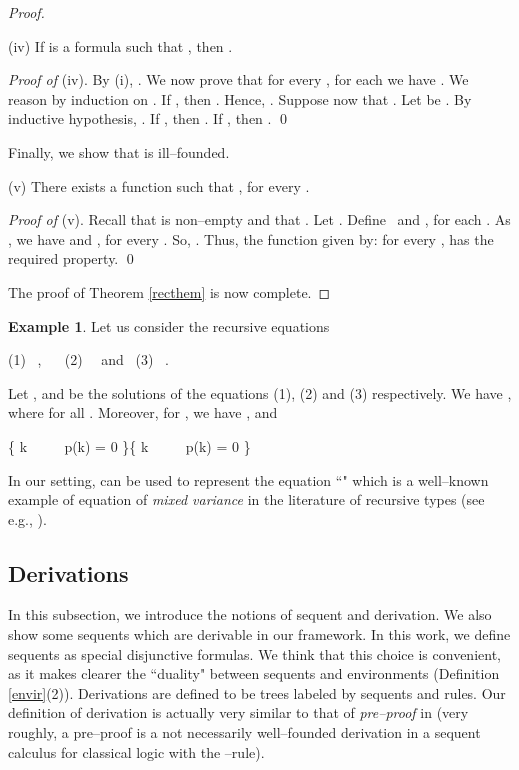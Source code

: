 \documentclass[copyright,creativecommons]{eptcs}
\def\eg{e.g., }
\newcommand{\st}{ \ \ \big{|} \ \ }
\theoremstyle{definition}
\newtheorem{Example}[theorem]{Example}
\newcommand{\squishlist}{
 \begin{list}{}
  { \setlength{\itemsep}{0pt}
     \setlength{\parsep}{3pt}
     \setlength{\topsep}{3pt}
     \setlength{\partopsep}{0pt}
     \setlength{\leftmargin}{1em}
     \setlength{\labelwidth}{1.5em}
     \setlength{\labelsep}{0.5em} } }
\newcommand{\squishend}{
  \end{list}  }
\begin{document}
\begin{proof}
\squishlist
\item[ (iv)] If   is a formula such that , then .
 \squishend
 \noindent\emph{Proof of} (iv).
By (i), .  We now prove that for every , for each  we have
 .
We reason by induction on .
If , then . Hence,
.
Suppose now that .
Let   be . By inductive hypothesis,  .
  If  , then .
 If  , then .
 \qed

Finally, we show that  is ill--founded.



\squishlist
\item[ (v)] There exists a function  such that
, for every .
 \squishend



 \noindent\emph{Proof of} (v).
Recall that   is non--empty and that . Let .
Define
\   and , for each .
As ,  we have  
and , for every .
So, .
Thus, the function  given by:  for every ,
has the required property. \qed



The proof of Theorem \ref{recthem} is now complete.
\end{proof}

 \begin{Example} \label{A to A}
Let us consider the recursive equations
\squishlist
\item[] {\centering  (1) \ \enspace, \ \  \qquad
(2) \ \quad \   and  \quad \  (3) \ \enspace. \par}
\squishend

\noindent Let ,  and  be the solutions of the equations (1), (2) and (3) respectively.
We have  , where  for all .
Moreover,  for , we have ,
  and
 \squishlist
\item[] {\centering
 \{ k \st p(k) = 0 \}\{ k \st p(k) = 0 \} \par}
\squishend
In our setting,   can be used to represent   the equation ``" which is a well--known  example of equation of \emph{mixed variance} in the literature of recursive types (see \eg \cite{MelVou}).
\hfill
 \end{Example}




\subsection{Derivations} \label{subder}
In this subsection, we introduce the notions of sequent and derivation. We also
show some  sequents which are derivable in our framework.
In this work, we   define sequents as special disjunctive formulas.  We think that this
choice  is convenient, as it  makes clearer the ``duality"
between sequents and environments (Definition \ref{envir}(2)).
Derivations are defined to be   trees labeled by sequents and rules. Our definition of derivation is
actually very similar to that of
 \emph{pre--proof} in \cite{PTLC} (very roughly, a pre--proof is a
 not necessarily well--founded
 derivation in
a sequent calculus for
classical logic with the
 --rule).
\end{document}
